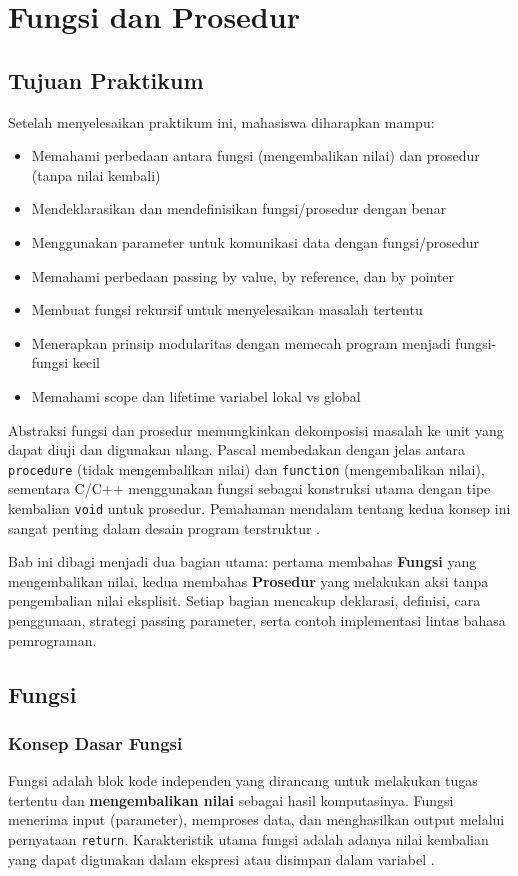 \documentclass[../main.tex]{subfiles}
\begin{document}
\chapter{Fungsi dan Prosedur}

\section*{Tujuan Praktikum}
Setelah menyelesaikan praktikum ini, mahasiswa diharapkan mampu:
\begin{itemize}
  \item Memahami perbedaan antara fungsi (mengembalikan nilai) dan prosedur (tanpa nilai kembali)
  \item Mendeklarasikan dan mendefinisikan fungsi/prosedur dengan benar
  \item Menggunakan parameter untuk komunikasi data dengan fungsi/prosedur
  \item Memahami perbedaan passing by value, by reference, dan by pointer
  \item Membuat fungsi rekursif untuk menyelesaikan masalah tertentu
  \item Menerapkan prinsip modularitas dengan memecah program menjadi fungsi-fungsi kecil
  \item Memahami scope dan lifetime variabel lokal vs global
\end{itemize}

Abstraksi fungsi dan prosedur memungkinkan dekomposisi masalah ke unit yang dapat diuji dan digunakan ulang. Pascal membedakan dengan jelas antara \texttt{procedure} (tidak mengembalikan nilai) dan \texttt{function} (mengembalikan nilai), sementara C/C++ menggunakan fungsi sebagai konstruksi utama dengan tipe kembalian \texttt{void} untuk prosedur. Pemahaman mendalam tentang kedua konsep ini sangat penting dalam desain program terstruktur \parencite{pascal-procedure-function,c-functions,cpp-functions}.

Bab ini dibagi menjadi dua bagian utama: pertama membahas \textbf{Fungsi} yang mengembalikan nilai, kedua membahas \textbf{Prosedur} yang melakukan aksi tanpa pengembalian nilai eksplisit. Setiap bagian mencakup deklarasi, definisi, cara penggunaan, strategi passing parameter, serta contoh implementasi lintas bahasa pemrograman.

\section{Fungsi}

\subsection{Konsep Dasar Fungsi}
Fungsi adalah blok kode independen yang dirancang untuk melakukan tugas tertentu dan \textbf{mengembalikan nilai} sebagai hasil komputasinya. Fungsi menerima input (parameter), memproses data, dan menghasilkan output melalui pernyataan \texttt{return}. Karakteristik utama fungsi adalah adanya nilai kembalian yang dapat digunakan dalam ekspresi atau disimpan dalam variabel \parencite{cpp-reference,gnu-c-manual}.
\end{document}
